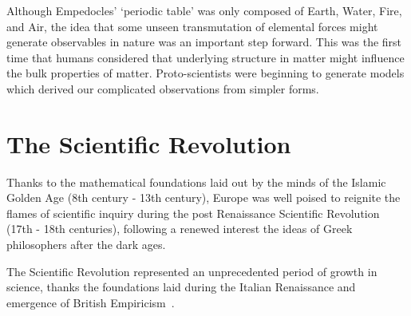 Although Empedocles' `periodic table' was only composed of Earth, Water, Fire,
and Air, the idea that some unseen transmutation of elemental forces might
generate observables in nature was an important step forward. This was the
first time that humans considered that underlying structure in matter might
influence the bulk properties of matter. Proto-scientists were beginning to
generate models which derived our complicated observations from simpler forms.

\clearpage
\section{The Scientific Revolution}

Thanks to the mathematical foundations laid out by the minds of the Islamic
Golden Age (8th century - 13th century), Europe was well poised to reignite the
flames of scientific inquiry during the post Renaissance Scientific
Revolution~\cite{Alexakos2005} (17th - 18th centuries), following a renewed
interest the ideas of Greek philosophers after the dark ages.

The Scientific Revolution represented an unprecedented period of growth in
science, thanks the foundations laid during the Italian Renaissance and
emergence of British Empiricism~\cite{Cowley1968}.

